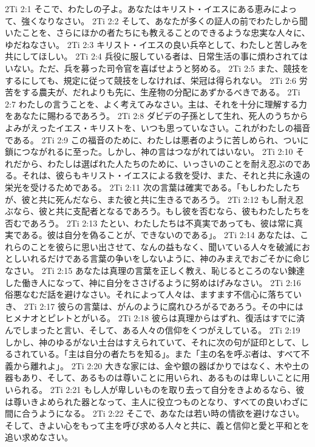 2Ti 2:1  そこで、わたしの子よ。あなたはキリスト・イエスにある恵みによって、強くなりなさい。
2Ti 2:2  そして、あなたが多くの証人の前でわたしから聞いたことを、さらにほかの者たちにも教えることのできるような忠実な人々に、ゆだねなさい。
2Ti 2:3  キリスト・イエスの良い兵卒として、わたしと苦しみを共にしてほしい。
2Ti 2:4  兵役に服している者は、日常生活の事に煩わされてはいない。ただ、兵を募った司令官を喜ばせようと努める。
2Ti 2:5  また、競技をするにしても、規定に従って競技をしなければ、栄冠は得られない。
2Ti 2:6  労苦をする農夫が、だれよりも先に、生産物の分配にあずかるべきである。
2Ti 2:7  わたしの言うことを、よく考えてみなさい。主は、それを十分に理解する力をあなたに賜わるであろう。
2Ti 2:8  ダビデの子孫として生れ、死人のうちからよみがえったイエス・キリストを、いつも思っていなさい。これがわたしの福音である。
2Ti 2:9  この福音のために、わたしは悪者のように苦しめられ、ついに鎖につながれるに至った。しかし、神の言はつながれてはいない。
2Ti 2:10  それだから、わたしは選ばれた人たちのために、いっさいのことを耐え忍ぶのである。それは、彼らもキリスト・イエスによる救を受け、また、それと共に永遠の栄光を受けるためである。
2Ti 2:11  次の言葉は確実である。「もしわたしたちが、彼と共に死んだなら、また彼と共に生きるであろう。
2Ti 2:12  もし耐え忍ぶなら、彼と共に支配者となるであろう。もし彼を否むなら、彼もわたしたちを否むであろう。
2Ti 2:13  たとい、わたしたちは不真実であっても、彼は常に真実である。彼は自分を偽ることが、できないのである」。
2Ti 2:14  あなたは、これらのことを彼らに思い出させて、なんの益もなく、聞いている人々を破滅におとしいれるだけである言葉の争いをしないように、神のみまえでおごそかに命じなさい。
2Ti 2:15  あなたは真理の言葉を正しく教え、恥じるところのない錬達した働き人になって、神に自分をささげるように努めはげみなさい。
2Ti 2:16  俗悪なむだ話を避けなさい。それによって人々は、ますます不信心に落ちていき、
2Ti 2:17  彼らの言葉は、がんのように腐れひろがるであろう。その中にはヒメナオとピレトとがいる。
2Ti 2:18  彼らは真理からはずれ、復活はすでに済んでしまったと言い、そして、ある人々の信仰をくつがえしている。
2Ti 2:19  しかし、神のゆるがない土台はすえられていて、それに次の句が証印として、しるされている。「主は自分の者たちを知る」。また「主の名を呼ぶ者は、すべて不義から離れよ」。
2Ti 2:20  大きな家には、金や銀の器ばかりではなく、木や土の器もあり、そして、あるものは尊いことに用いられ、あるものは卑しいことに用いられる。
2Ti 2:21  もし人が卑しいものを取り去って自分をきよめるなら、彼は尊いきよめられた器となって、主人に役立つものとなり、すべての良いわざに間に合うようになる。
2Ti 2:22  そこで、あなたは若い時の情欲を避けなさい。そして、きよい心をもって主を呼び求める人々と共に、義と信仰と愛と平和とを追い求めなさい。
